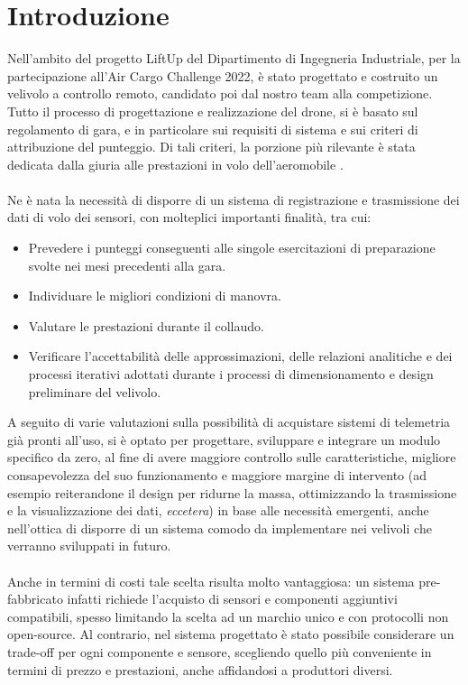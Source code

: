 \documentclass[12pt]{article}
\begin{document}
\section{Introduzione}
Nell'ambito del progetto LiftUp del Dipartimento di Ingegneria Industriale, per la partecipazione all'Air Cargo Challenge 2022, è stato progettato e costruito un velivolo a controllo remoto, candidato poi dal nostro team alla competizione.
Tutto il processo di progettazione e realizzazione del drone, si è basato sul regolamento di gara, e in particolare sui requisiti di sistema e sui criteri di attribuzione del punteggio. Di tali criteri, la porzione più rilevante è stata dedicata dalla giuria alle prestazioni in volo dell'aeromobile \cite{regulation}. 
\\\\
Ne è nata la necessità di disporre di un sistema di registrazione e trasmissione dei dati di volo dei sensori, con molteplici importanti finalità, tra cui: 

\begin{itemize}
\item Prevedere i punteggi conseguenti alle singole esercitazioni di preparazione svolte nei mesi precedenti alla gara.
\item Individuare le migliori condizioni di manovra.
\item Valutare le prestazioni durante il collaudo.
\item Verificare l'accettabilità delle approssimazioni, delle relazioni analitiche e dei processi iterativi adottati durante i processi di dimensionamento e design preliminare del velivolo.
\end{itemize}

\noindent
A seguito di varie valutazioni sulla possibilità di acquistare sistemi di telemetria già pronti all'uso, si è optato per progettare, sviluppare e integrare un modulo specifico da zero, al fine di avere maggiore controllo sulle caratteristiche, migliore consapevolezza del suo funzionamento e maggiore margine di intervento (ad esempio reiterandone il design per ridurne la massa, ottimizzando la trasmissione e la visualizzazione dei dati, \textit{eccetera}) in base alle necessità emergenti, anche nell'ottica di disporre di un sistema comodo da implementare nei velivoli che verranno sviluppati in futuro.
\\\\
Anche in termini di costi tale scelta risulta molto vantaggiosa: un sistema pre-fabbricato infatti richiede l'acquisto di sensori e componenti aggiuntivi compatibili, spesso limitando la scelta ad un marchio unico e con protocolli non open-source. Al contrario, nel sistema progettato è stato possibile considerare un trade-off per ogni componente e sensore, scegliendo quello più conveniente in termini di prezzo e prestazioni, anche affidandosi a produttori diversi. 
\end{document}
